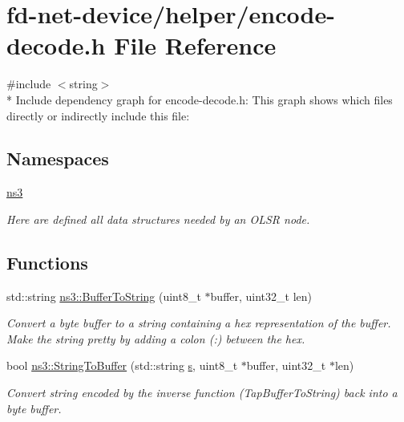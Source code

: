\hypertarget{encode-decode_8h}{}\section{fd-\/net-\/device/helper/encode-\/decode.h File Reference}
\label{encode-decode_8h}
{\ttfamily \#include $<$string$>$}\\*
Include dependency graph for encode-\/decode.h\+:
This graph shows which files directly or indirectly include this file\+:
\subsection*{Namespaces}
\begin{DoxyCompactItemize}
\item 
 \hyperlink{namespacens3}{ns3}
\begin{DoxyCompactList}\small\item\em Here are defined all data structures needed by an O\+L\+SR node. \end{DoxyCompactList}\end{DoxyCompactItemize}
\subsection*{Functions}
\begin{DoxyCompactItemize}
\item 
std\+::string \hyperlink{namespacens3_a97907497171f00140c77ed054e3baad6}{ns3\+::\+Buffer\+To\+String} (uint8\+\_\+t $\ast$buffer, uint32\+\_\+t len)
\begin{DoxyCompactList}\small\item\em Convert a byte buffer to a string containing a hex representation of the buffer. Make the string pretty by adding a colon (\textquotesingle{}\+:\textquotesingle{}) between the hex. \end{DoxyCompactList}\item 
bool \hyperlink{namespacens3_a8582a97439c4fae64f9d073a91fc7699}{ns3\+::\+String\+To\+Buffer} (std\+::string \hyperlink{generate__test__data__lte__sinr_8m_ad83eeb3a142285d1243a08c6b7026df8}{s}, uint8\+\_\+t $\ast$buffer, uint32\+\_\+t $\ast$len)
\begin{DoxyCompactList}\small\item\em Convert string encoded by the inverse function (Tap\+Buffer\+To\+String) back into a byte buffer. \end{DoxyCompactList}\end{DoxyCompactItemize}
